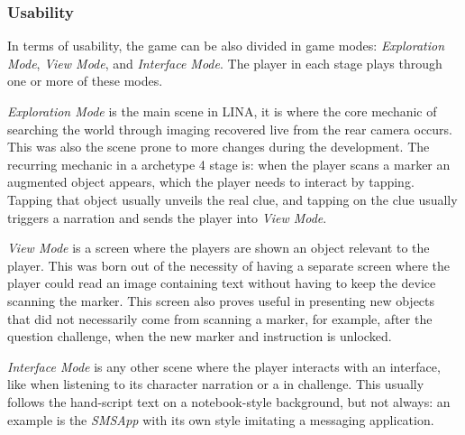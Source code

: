 \subsubsection{Usability}
\par In terms of usability, the game can be also divided in game modes: \textit{Exploration Mode}, \textit{View Mode}, and \textit{Interface Mode}. The player in each stage plays through one or more of these modes.
\par\textit{Exploration Mode} is the main scene in LINA, it is where the core mechanic of searching the world through imaging recovered live from the rear camera occurs. This was also the scene prone to more changes during the development. The recurring mechanic in a archetype 4 stage is: when the player scans a marker an augmented object appears, which the player needs to interact by tapping. Tapping that object usually unveils the real clue, and tapping on the clue usually triggers a narration and sends the player into \textit{View Mode}.
\par \textit{View Mode} is a screen where the players are shown an object relevant to the player. This was born out of the necessity of having a separate screen where the player could read an image containing text without having to keep the device scanning the marker. This screen also proves useful in presenting new objects that did not necessarily come from scanning a marker, for example, after the question challenge, when the new marker and instruction is unlocked.
\par \textit{Interface Mode} is any other scene where the player interacts with an interface, like when listening to its character narration or a in challenge. This usually follows the hand-script text on a notebook-style background, but not always: an example is the \textit{SMSApp} with its own style imitating a messaging application.

